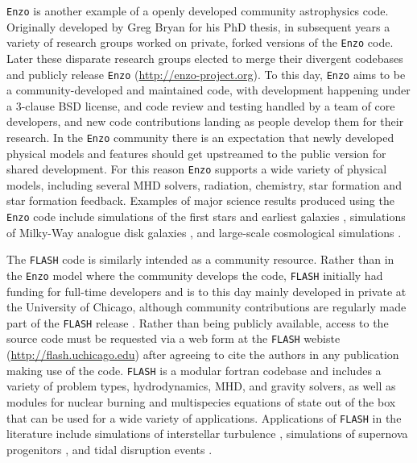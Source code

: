 \documentclass[11pt,twoside]{article}
\begin{document}
\texttt{Enzo} \citep{bryan2014} is another example of a openly developed community astrophysics code. Originally developed by Greg Bryan for his PhD thesis, in subsequent years a variety of research groups worked on private, forked versions of the \texttt{Enzo} code. Later these disparate research groups elected to merge their divergent codebases and publicly release \texttt{Enzo} (\url{http://enzo-project.org}). To this day, \texttt{Enzo} aims to be a community-developed and maintained code, with development happening under a 3-clause BSD license, and code review and testing handled by a team of core developers, and new code contributions landing as people develop them for their research. In the \texttt{Enzo} community there is an expectation that newly developed physical models and features should get upstreamed to the public version for shared development. For this reason \texttt{Enzo} supports a wide variety of physical models, including several MHD solvers, radiation, chemistry, star formation and star formation feedback. Examples of major science results produced using the \texttt{Enzo} code include simulations of the first stars \citep{abel2002} and earliest galaxies \citep{wise2012}, simulations of Milky-Way analogue disk galaxies \citep{goldbaum2016}, and large-scale cosmological simulations \citep{xu2016}.

The \texttt{FLASH} code \citep{fryxell2000} is similarly intended as a community resource. Rather than in the \texttt{Enzo} model where the community develops the code, \texttt{FLASH} initially had funding for full-time developers and is to this day mainly developed in private at the University of Chicago, although community contributions are regularly made part of the \texttt{FLASH} release \citep{dubey2013}. Rather than being publicly available, access to the source code must be requested via a web form at the \texttt{FLASH} webiste (\url{http://flash.uchicago.edu}) after agreeing to cite the authors in any publication making use of the code. \texttt{FLASH} is a modular fortran codebase and includes a variety of problem types, hydrodynamics, MHD, and gravity solvers, as well as modules for nuclear burning and multispecies equations of state out of the box that can be used for a wide variety of applications. Applications of \texttt{FLASH} in the literature include simulations of interstellar turbulence \citep{federrath2013}, simulations of supernova progenitors \citep{couch2014}, and tidal disruption events \citep{guillochon2013}.
\end{document}
